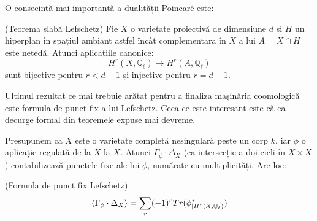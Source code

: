 \documentclass[13pt,openany]{book}
\begin{document}
O consecință mai importantă a dualității Poincaré este:

\begin{teo}
(Teorema slabă Lefschetz) Fie $X$ o varietate proiectivă de dimensiune $d$ și $H$ un hiperplan în spațiul ambiant astfel încât complementara în $X$ a lui $A = X \cap H$ este netedă. Atunci aplicațiile canonice:
$$H^r(X,\mathbb{Q}_\ell) \rightarrow H^r(A,\mathbb{Q}_\ell)$$
sunt bijective pentru $r < d-1$ și injective pentru $r=d-1$.
\end{teo}

Ultimul rezultat ce mai trebuie arătat pentru a finaliza mașinăria coomologică este formula de punct fix a lui Lefschetz. Ceea ce este interesant este că ea decurge formal din teoremele expuse mai devreme.

Presupunem că $X$ este o varietate completă nesingulară peste un corp $k$, iar $\phi$ o aplicație regulată de la $X$ la $X$. Atunci $\Gamma_\phi \cdot \Delta_X$ (ca intersecție a doi cicli în $X \times X$) contabilizează punctele fixe ale lui $\phi$, numărate cu multiplicități. Are loc:

\begin{teo}
(Formula de punct fix Lefschetz)
$$\langle \Gamma_\phi \cdot \Delta_X \rangle = \sum\limits_r (-1)^r Tr(\phi^*_{\mid H^r(X,\mathbb{Q}_\ell)})$$
\end{teo}
\end{document}
